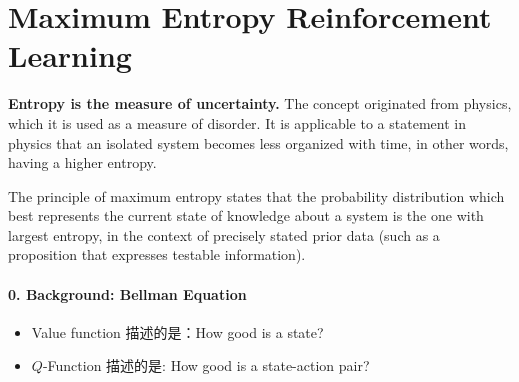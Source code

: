 ﻿

\chapter{Maximum Entropy Reinforcement Learning}


{\bf Entropy is the measure of uncertainty.} The concept originated from 
physics, which it is used as a measure of disorder. It is applicable to 
a statement in physics that an isolated system becomes less organized with 
time, in other words, having a higher entropy.

The principle of maximum entropy states that the probability distribution 
which best represents the current state of knowledge about a system is the 
one with largest entropy, in the context of precisely stated prior data 
(such as a proposition that expresses testable information).

\subsubsection{0. Background: Bellman Equation}

\begin{itemize}
\item
Value function 描述的是：How good is a state?

\item
$Q$-Function 描述的是: How good is a state-action pair?
\end{itemize}

